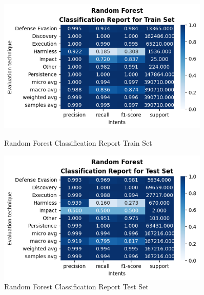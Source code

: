 \begin{figure}[H]
            \vspace{0.5cm}  %

            \begin{minipage}{\textwidth}
                \begin{minipage}[t]{0.48\textwidth}
                    \centering
                    \includegraphics[width=0.9\textwidth]{../figures/plots/section2/Random_Forest_classification_report_for_Train_set.png}
                    \caption{Random Forest Classification Report Train Set}
                    \label{fig:rf_cm_train}
                \end{minipage}%
                \hfill%
                \begin{minipage}[t]{0.48\textwidth}
                    \centering
                    \includegraphics[width=0.9\textwidth]{../figures/plots/section2/Random_Forest_classification_report_for_Test_set.png}
                    \caption{Random Forest Classification Report Test Set}
                    \label{fig:rf_cm_test}
                \end{minipage}  
            
            \end{minipage}
            
        \end{figure}
            
